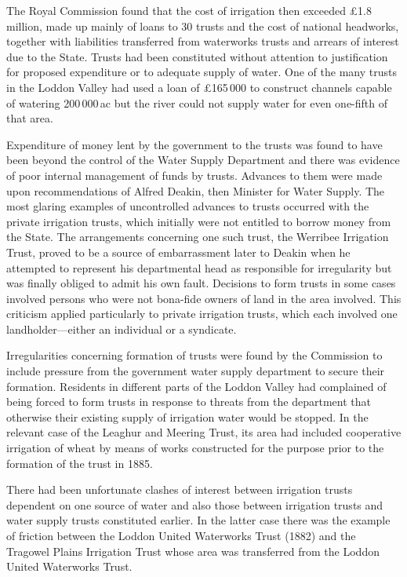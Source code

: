 The Royal Commission found that the cost of irrigation then exceeded
\pounds1.8\,million, made up mainly of loans to 30 trusts and the cost of
national headworks, together with liabilities transferred from
waterworks trusts and arrears of interest due to the State.  Trusts had been
constituted without attention to justification for proposed
expenditure or to adequate supply of water.  One of the many trusts in
the Loddon Valley had used a loan of \pounds165\,000 to construct
channels capable of watering 200\,000\,ac but the river could not
supply water for even one-fifth of that area.

Expenditure of money lent by the government to the trusts was found to
have been beyond the control of the Water Supply Department and there
was evidence of poor internal management of funds by trusts.  Advances
to them were made upon recommendations of Alfred Deakin, then Minister
for Water Supply.  The most glaring examples of uncontrolled advances
to trusts occurred with the private irrigation trusts, which initially
were not entitled to borrow money from the State.  The arrangements
concerning one such trust, the Werribee Irrigation Trust, proved to be
a source of embarrassment later to Deakin when he attempted to
represent his departmental head as responsible for irregularity but
was finally obliged to admit his own fault.  Decisions to form trusts in some cases involved persons
who were not bona-fide owners of land in the area involved.  This
criticism applied particularly to private irrigation trusts, which
each involved one landholder---either an individual or a syndicate.

Irregularities concerning formation of trusts were found by the
Commission to include pressure from the government water supply
department to secure their formation.  Residents in different parts of
the Loddon Valley had complained of being forced to form trusts in
response to threats from the department that otherwise their existing
supply of irrigation water would be stopped.  In the relevant case of
the Leaghur and Meering Trust, its area had included cooperative
irrigation of wheat by means of works constructed for the purpose
prior to the formation of the trust in 1885.

There had been unfortunate clashes of interest between irrigation
trusts dependent on one source of water and also those between
irrigation trusts and water supply trusts constituted earlier.  In the
latter case there was the example of friction between the Loddon
United Waterworks Trust (1882) and the Tragowel Plains Irrigation
Trust whose area was transferred from the Loddon United Waterworks
Trust.


